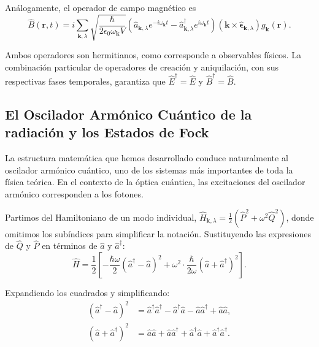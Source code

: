         Análogamente, el operador de campo magnético es
        \begin{equation}
            \hat{B}(\mathbf{r}, t) = i\sum_{\mathbf{k},\lambda} \sqrt{\frac{\hbar}{2\epsilon_0\omega_{\mathbf{k}} V}} \left(\hat{a}_{\mathbf{k},\lambda} e^{-i\omega_{\mathbf{k}} t} - \hat{a}^\dagger_{\mathbf{k},\lambda} e^{i\omega_{\mathbf{k}} t}\right) (\mathbf{k} \times \hat{\boldsymbol{\epsilon}}_{\mathbf{k},\lambda}) g_{\mathbf{k}}(\mathbf{r}).
        \end{equation}
        
        Ambos operadores son hermitianos, como corresponde a observables físicos. La combinación particular de operadores de creación y aniquilación, con sus respectivas fases temporales, garantiza que $\hat{E}^\dagger = \hat{E}$ y $\hat{B}^\dagger = \hat{B}$.


        \subsection{El Oscilador Armónico Cuántico de la radiación y los Estados de Fock}
            
            La estructura matemática que hemos desarrollado conduce naturalmente al oscilador armónico cuántico, uno de los sistemas más importantes de toda la física teórica. En el contexto de la óptica cuántica, las excitaciones del oscilador armónico corresponden a los fotones.

            Partimos del Hamiltoniano de un modo individual, $\hat{H}_{\mathbf{k},\lambda} = \frac{1}{2}(\hat{P}^2 + \omega^2\hat{Q}^2)$, donde omitimos los subíndices para simplificar la notación. Sustituyendo las expresiones de $\hat{Q}$ y $\hat{P}$ en términos de $\hat{a}$ y $\hat{a}^\dagger$:
            \begin{equation}
                \hat{H} = \frac{1}{2}\left[-\frac{\hbar\omega}{2}(\hat{a}^\dagger - \hat{a})^2 + \omega^2 \cdot \frac{\hbar}{2\omega}(\hat{a} + \hat{a}^\dagger)^2\right].
            \end{equation}
            
            Expandiendo los cuadrados y simplificando:
            \begin{align}
                (\hat{a}^\dagger - \hat{a})^2 &= \hat{a}^\dagger\hat{a}^\dagger - \hat{a}^\dagger\hat{a} - \hat{a}\hat{a}^\dagger + \hat{a}\hat{a}, \\
                (\hat{a} + \hat{a}^\dagger)^2 &= \hat{a}\hat{a} + \hat{a}\hat{a}^\dagger + \hat{a}^\dagger\hat{a} + \hat{a}^\dagger\hat{a}^\dagger.
            \end{align}
            
